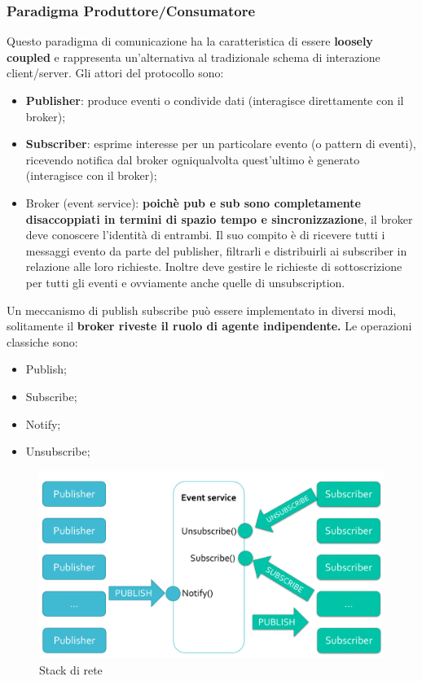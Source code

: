 \documentclass[12pt]{article}
\begin{document}
    		\subsubsection{Paradigma Produttore/Consumatore}
    			Questo paradigma di comunicazione ha la caratteristica di essere \textbf{loosely coupled} e rappresenta un'alternativa al tradizionale schema di interazione client/server. Gli attori del protocollo sono:
    			\begin{itemize}
    				\item \textbf{Publisher}: produce eventi o condivide dati (interagisce direttamente con il broker);
    				\item \textbf{Subscriber}: esprime interesse per un particolare evento (o pattern di eventi), ricevendo notifica dal broker ogniqualvolta quest'ultimo è generato (interagisce con il broker);
    				\item Broker (event service): \textbf{poichè pub e sub sono completamente disaccoppiati in termini di spazio tempo e sincronizzazione}, il broker deve conoscere l'identità di entrambi. Il suo compito è di ricevere tutti i messaggi evento da parte del publisher, filtrarli e distribuirli ai subscriber in relazione alle loro richieste. Inoltre deve gestire le richieste di sottoscrizione per tutti gli eventi e ovviamente anche quelle di unsubscription. 
    			\end{itemize}
    			Un meccanismo di publish subscribe può essere implementato in diversi modi, solitamente il \textbf{broker riveste il ruolo di agente indipendente.} Le operazioni classiche sono:
    			\begin{itemize}
    				\item Publish;
    				\item Subscribe;
    				\item Notify;
    				\item Unsubscribe;
    			\end{itemize} 
    			\begin{figure}[h!]
    				\centering
    				\includegraphics[scale=0.3]{img/pubsub.png}
    				\caption{Stack di rete}
    			\end{figure}
\end{document}
